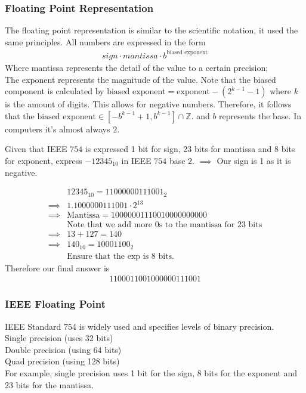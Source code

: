\documentclass[a4paper]{article}
\theoremstyle{plain}
\theoremstyle{definition}
\newtheorem{exmp}{Example}[section]
\theoremstyle{remark}
\begin{document}
\subsubsection{Floating Point Representation}
The floating point representation is similar to the scientific notation, it used the same principles. All numbers are expressed in the form
\begin{align*}
	sign \cdot mantissa \cdot b^{\text{biased exponent}}
\end{align*}
Where mantissa represents the detail of the value to a certain precision; \\
The exponent represents the magnitude of the value. Note that the biased component is calculated by $\text{biased exponent}=\text{exponent}-(2^{k-1}-1)$ where $k$ is the amount of digits. This allows for negative numbers. Therefore, it follows that the $\text{biased exponent} \in [-b^{k-1}+1,b^{k-1}] \cap \mathbb{Z}$. and $b$ represents the base. In computers it's almost always $2$.
\begin{tcolorbox}[colback=black!3!white,colframe=black!60!white,title=\begin{exmp}Base 10 \label{Base 10}\end{exmp}]
Given that IEEE $754$ is expressed 1 bit for sign, 23 bits for mantissa and 8 bits for exponent, express $-12345_{10}$ in IEEE $754$ base $2$. $\implies$ Our sign is 1 as it is negative. 

                \begin{align}
			&12345_{10}=11000000111001_2  \\
			\implies & 1.1000000111001 \cdot 2^{13}\\
			\implies & \text{Mantissa}=10000001110010000000000 \\
				 &\text{Note that we add more $0 $s to the mantissa for 23 bits}\\
			\implies & 13+127=140\\
			\implies & 140_{10}=10001100_2\\
				 & \text{Ensure that the exp is 8 bits.}
                \end{align}
		Therefore our final answer is
		\begin{align}
		1100011001000000111001
		\end{align}
\end{tcolorbox}
\subsubsection{IEEE Floating Point}
IEEE Standard 754 is widely used and specifies levels of binary precision.\\
Single precision (uses 32 bits)\\
Double precision (using 64 bits) \\
Quad precision (using 128 bits) \\
For example, single precision uses 1 bit for the sign, 8 bits for the exponent and 23 bits for the mantissa.
\end{document}
